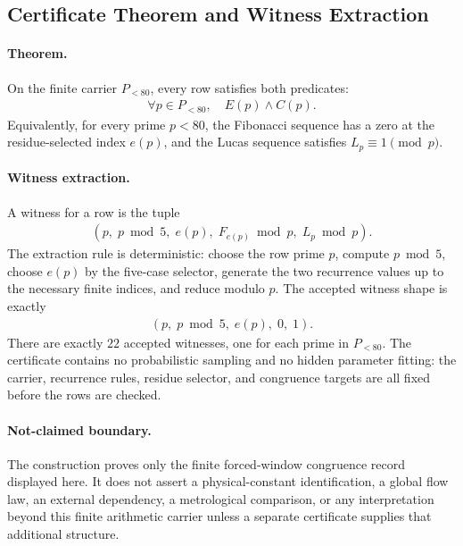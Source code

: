 \subsection{Certificate Theorem and Witness Extraction}
\label{sec:window6-certificate-theorem}

\paragraph{Theorem.}
On the finite carrier $P_{<80}$, every row satisfies both predicates:
$$
\begin{aligned}
\forall p\in P_{<80},\quad E(p)\wedge C(p).
\end{aligned}
$$
Equivalently, for every prime $p<80$, the Fibonacci sequence has a zero at the residue-selected index $e(p)$, and the Lucas sequence satisfies $L_p\equiv 1\pmod p$.

\paragraph{Witness extraction.}
A witness for a row is the tuple
$$
\begin{aligned}
(p,\;p\bmod 5,\;e(p),\;F_{e(p)}\bmod p,\;L_p\bmod p).
\end{aligned}
$$
The extraction rule is deterministic: choose the row prime $p$, compute $p\bmod 5$, choose $e(p)$ by the five-case selector, generate the two recurrence values up to the necessary finite indices, and reduce modulo $p$. The accepted witness shape is exactly
$$
\begin{aligned}
(p,\;p\bmod 5,\;e(p),\;0,\;1).
\end{aligned}
$$
There are exactly $22$ accepted witnesses, one for each prime in $P_{<80}$. The certificate contains no probabilistic sampling and no hidden parameter fitting: the carrier, recurrence rules, residue selector, and congruence targets are all fixed before the rows are checked.

\paragraph{Not-claimed boundary.}
The construction proves only the finite forced-window congruence record displayed here. It does not assert a physical-constant identification, a global flow law, an external dependency, a metrological comparison, or any interpretation beyond this finite arithmetic carrier unless a separate certificate supplies that additional structure.